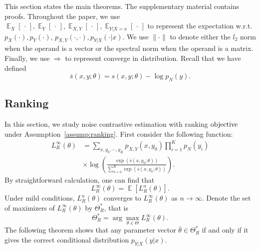 \documentclass[11pt,a4paper]{article}
\DeclareMathOperator{\E}{\mathbb{E}}
\newcommand{\wt}[1]{\widetilde{#1}}
\newcommand{\wh}[1]{\widehat{#1}}
\newcommand{\str}[3]{s(#1, #2; #3)}
\newcommand{\ssf}[3]{\bar{s}(#1, #2; #3)}
\newcommand{\commentout}[1]{}
\newcommand{\loss}{\hbox{objective}}
\begin{document}
This section states the main theorems. The supplementary material
contains proofs. Throughout the paper, we use $\E_{X}[\,\cdot\,], \E_{Y}[\,\cdot\,], \E_{X, Y}[\,\cdot\,], \E_{Y|X=x}[\,\cdot\,]$
to represent the expectation w.r.t. $p_X(\cdot), p_Y(\cdot)$, $p_{X, Y}(\cdot, \cdot),p_{Y|X}(\cdot|x)$. 
We use $\|\cdot\|$ to denote either the $l_2$
norm when the operand is a vector or the spectral norm when the
operand is a matrix. Finally, we use $\Rightarrow$ to represent converge in distribution.
Recall that we have defined 
\[
\ssf{x}{y}{\theta} = \str{x}{y}{\theta} - \log p_N(y).
\]

\commentout{
In practice, $p_Y(\cdot)$ is
unknown but can be substituted by its sample estimate, e.g. the
empirical distribution of $y$. 
\commentout{
This paper focuses on the regime where
the sample size is large enough, to the extent that the conditional
distribution $p_{Y|X}(\cdot\,|\,\cdot)$ can be well estimated, that is
$n >> |\mathcal{X}\times \mathcal{Y}|$. Under this condition, the
estimation of $p_Y(\cdot)$ is a second order issue compared with the
estimation of the scoring function $s(x, y;\theta)$. }
Technically, to
avoid this simplification, one can divide the training samples into
two parts, using the first part to construct an estimator of
$p_Y(\cdot)$, denoted by $\wh{p}_Y(\cdot)$, and run the noise
contrastive estimation algorithm on the second part with
$\wt{p}_Y(\cdot) = \wh{p}_Y(\cdot)$. This guarantees the negative
samples $(y^{(i, 1)}, \cdots, y^{(i, K)})$ drawn from
$\wt{p}_Y(\cdot)$ and the training example $(x^{(i)}, y^{(i)})$ are
independent such that the asymptotic analysis in the proof will go
through.}

\subsection{Ranking}
\label{sec:ranking}
In this section, we study noise contrastive estimation with ranking $\loss$ under Assumption~\ref{assump:ranking}. 
First consider the following function:
\begin{equation*}
\begin{aligned}
L_R^\infty(\theta) & = \sum_{x, y_0, \cdots, y_K} p_{X, Y}(x, y_0)\prod_{i=1}^K p_N(y_i)  \\
& \times  \log\left(\frac{\exp(\ssf{x}{y_0}{\theta})}{\sum_{k=0}^K \exp( \ssf{x}{y_k}{\theta})}\right).  
\end{aligned}
\end{equation*}
By straightforward calculation, one can find that 
\[
L_R^\infty(\theta) = \E \left[
  L_R^n(\theta)\right].
\]
Under mild conditions, $L^n_R(\theta)$
converges to $L^\infty_R(\theta)$ as $n \rightarrow \infty$. 
Denote the set of maximizers of $L^\infty_R(\theta)$ by $\Theta_R^* $, that is 
 \[
 \Theta_R^* = \arg\max_{\theta\in\Theta} L_R^\infty\left(\theta\right).
 \]
The following theorem shows that any parameter vector $\bar{\theta}
\in \Theta_R^*$ if and only if it gives the correct conditional distribution $p_{Y|X}(y
| x)$. 
\end{document}
